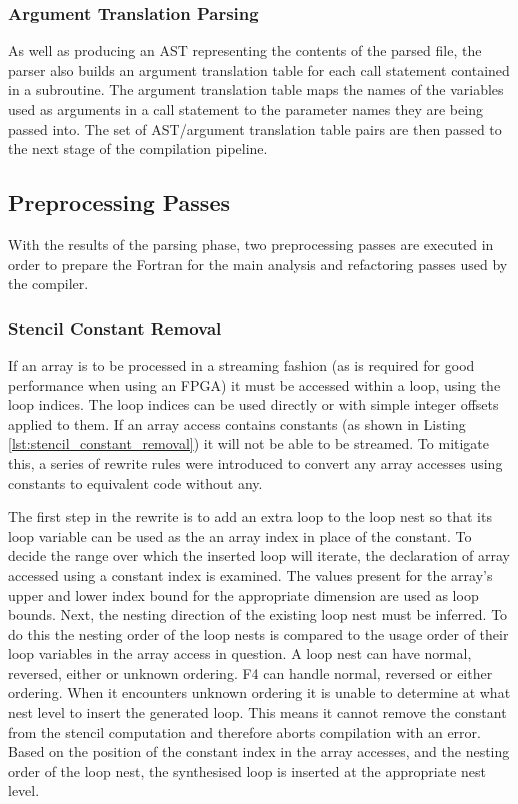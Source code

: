\documentclass{mpaper}
\begin{document}
\subsubsection*{Argument Translation Parsing}

As well as producing an AST representing the contents of the parsed file, the parser also builds an argument translation table for each call statement contained in a subroutine. The argument translation table maps the names of the variables used as arguments in a call statement to the parameter names they are being passed into. The set of AST/argument translation table pairs are then passed to the next stage of the compilation pipeline.

\subsection{Preprocessing Passes}

With the results of the parsing phase, two preprocessing passes are executed in order to prepare the Fortran for the main analysis and refactoring passes used by the compiler. 

\subsubsection*{Stencil Constant Removal}
\label{stencil_constant_removal}

If an array is to be processed in a streaming fashion (as is required for good performance when using an FPGA) it must be accessed within a loop, using the loop indices.
The loop indices can be used directly or with simple integer offsets applied to them.
If an array access contains constants (as shown in Listing \ref{lst:stencil_constant_removal}) it will not be able to be streamed.
To mitigate this, a series of rewrite rules were introduced to convert any array accesses using constants to equivalent code without any.

The first step in the rewrite is to add an extra loop to the loop nest so that its loop  variable can be used as the an array index in place of the constant.
To decide the range over which the inserted loop will iterate, the declaration of array accessed using a constant index is examined.
The values present for the array's upper and lower index bound for the appropriate dimension are used as loop bounds.
Next, the nesting direction of the existing loop nest must be inferred.
To do this the nesting order of the loop nests is compared to the usage order of their loop variables in the array access in question.
A loop nest can have normal, reversed, either or unknown ordering.
F4 can handle normal, reversed or either ordering.
When it encounters unknown ordering it is unable to determine at what nest level to insert the generated loop.
This means it cannot remove the constant from the stencil computation and therefore aborts compilation with an error.
Based on the position of the constant index in the array accesses, and the nesting order of the loop nest, the synthesised loop is inserted at the appropriate nest level.
\end{document}
